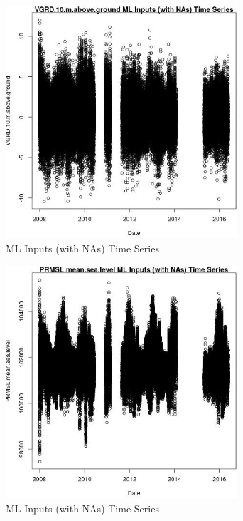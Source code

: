 \begin{figure} 
\centering  
\includegraphics[width=0.77\textwidth]{Code_Outputs/Report_ML_input_PM25_Step4_part_e_de_duplicated_aveswNAs_VGRD10mabovegroundvDate.jpg} 
\caption{\label{fig:Report_ML_input_PM25_Step4_part_e_de_duplicated_aveswNAsVGRD10mabovegroundvDate}ML Inputs (with NAs) Time Series} 
\end{figure} 
 

\begin{figure} 
\centering  
\includegraphics[width=0.77\textwidth]{Code_Outputs/Report_ML_input_PM25_Step4_part_e_de_duplicated_aveswNAs_PRMSLmeansealevelvDate.jpg} 
\caption{\label{fig:Report_ML_input_PM25_Step4_part_e_de_duplicated_aveswNAsPRMSLmeansealevelvDate}ML Inputs (with NAs) Time Series} 
\end{figure} 
 

